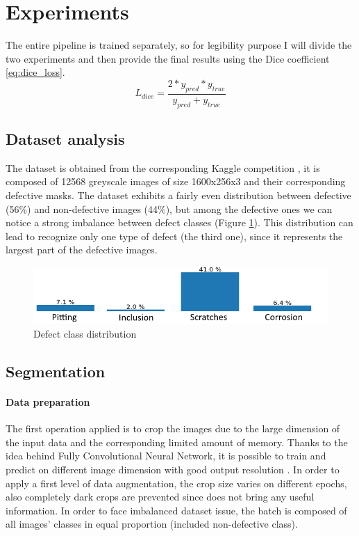 \documentclass[10pt,twocolumn,letterpaper]{article}
\begin{document}
\section{Experiments}
   The entire pipeline is trained separately, so for legibility purpose I will divide the two experiments and then provide the final results using the Dice coefficient \eqref{eq:dice_loss}.
   \begin{equation}\label{eq:dice_loss}
      L_{dice} = \frac{2 * y_{pred} * y_{true}}{y_{pred} + y_{true}}
   \end{equation}

   \subsection{Dataset analysis}
   The dataset is obtained from the corresponding Kaggle competition \cite{Severstal}, it is composed of 12568 greyscale images of size 1600x256x3 and their corresponding defective masks.
   The dataset exhibits a fairly even distribution between defective (56\%) and non-defective images (44\%), but among the defective ones we can notice a strong imbalance between defect classes (Figure \ref{fig:classImbalance}). This distribution can lead to recognize only one type of defect (the third one), since it represents the largest part of the defective images.
   \begin{figure}[h]
      \centering
      \caption{Defect class distribution} \label{fig:classImbalance}
      \includegraphics[scale=0.45]{Img_ClassImbalance}
   \end{figure}

   \subsection{Segmentation}
      \paragraph{Data preparation}
         The first operation applied is to crop the images due to the large dimension of the input data and the corresponding limited amount of memory. Thanks to the idea behind Fully Convolutional Neural Network, it is possible to train and predict on different image dimension with good output resolution \cite{FCNN}.
         In order to apply a first level of data augmentation, the crop size varies on different epochs, also completely dark crops are prevented since does not bring any useful information.
         In order to face imbalanced dataset issue, the batch is composed of all images' classes in equal proportion (included non-defective class).
\end{document}
